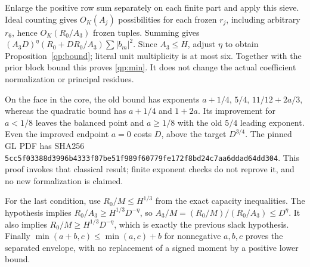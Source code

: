 Enlarge the positive row sum separately on each finite part and apply
this sieve. Ideal counting gives $O_K(A_j)$ possibilities for each frozen
$r_j$, including arbitrary $r_6$, hence $O_K(R_0/A_3)$ frozen tuples.
Summing gives $(A_3D)^\eta(R_0+DR_0/A_3)\sum|b_m|^2$.
Since $A_3\le H$, adjust $\eta$ to obtain
Proposition~\ref{qp:bound}; literal unit multiplicity is at most six.
Together with the prior block bound this proves
\eqref{qp:min}. It does not change the actual coefficient
normalization or principal residues.

On the face in the core, the old bound has exponents
$a+1/4$, $5/4$, $11/12+2a/3$, whereas the quadratic bound has
$a+1/4$ and $1+2a$. Its improvement for $a<1/8$ leaves the balanced
point and $a\ge1/8$ with the old $5/4$ leading exponent. Even the
improved endpoint $a=0$ costs $D$, above the target $D^{3/4}$.
The pinned GL PDF has SHA256
\texttt{5cc5f03388d3996b4333f07be51f989f60779fe172f8bd24c7aa6ddad64dd304}.
This proof invokes that classical result; finite exponent checks do not
reprove it, and no new formalization is claimed.

For the last condition, use $R_0/M\le H^{1/3}$ from the exact
capacity inequalities. The hypothesis implies
$R_0/A_3\ge H^{1/3}D^{-\eta}$, so
$A_3/M=(R_0/M)/(R_0/A_3)\le D^\eta$.
It also implies $R_0/M\ge H^{1/3}D^{-\eta}$, which is exactly
the previous slack hypothesis. Finally
$\min(a+b,c)\le\min(a,c)+b$ for nonnegative $a,b,c$
proves the separated envelope, with no replacement of a signed moment
by a positive lower bound.
